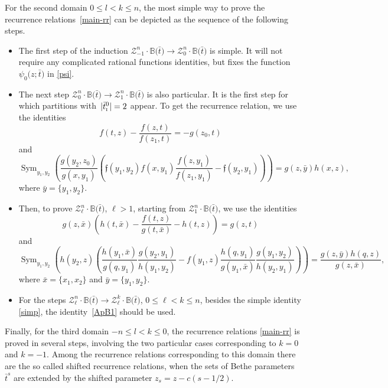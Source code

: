 \documentclass[10pt,a4paper]{amsart}
\newcommand{\so}{\scriptscriptstyle \rm I}
\newcommand{\bt}{{\bar t}}
\theoremstyle{definition}
\def\BB{{\mathbb{B}}}
\def\r#1{\eqref{#1}}
\def\sk#1{\left(#1\right)}
\def\fgo{\mathfrak{f}}
\def\Z{\mathcal{Z}}
\begin{document}
For the second domain $0\leq l< k\leq n$, the
 most simple way to prove the recurrence relations~\r{main-rr}
can be depicted as the sequence
of the following steps.

\begin{itemize}\itemsep=0pt
\item The first step of the induction $\Z^n_{-1}\cdot\BB\bigl(\bt\bigr)\to \Z^n_0\cdot\BB\bigl(\bt\bigr)$
is simple. It will not require any complicated rational functions identities,
but fixes the function $\psi_0\bigl(z;\bt\bigr)$ in \r{psi}.
 \item The next step $\Z^n_{0}\cdot\BB\bigl(\bt\bigr)\to \Z^n_1\cdot\BB\bigl(\bt\bigr)$ is also particular.
It is the first step for which partitions with~${|\bar t^0_{\so}|=2}$ appear.
 To get the recurrence relation, we use the identities
\begin{equation}\label{ApB0}
 f(t,z)-\frac{f(z,t)}{f(z_1,t)}=-g(z_0,t)
 \end{equation}
 and
\begin{equation}\label{ApB4}
 \mathop{\operatorname{ Sym}}_{y_1,y_2}\left(\frac{g(y_2,z_0)}{g(x,y_1)}
 \left(
 \fgo(y_1,y_2) f(x,y_1) \frac{f(z,y_1)}{f(z_1,y_1)} - \fgo(y_2,y_1)
 \right)\right)= g(z,\bar y) h(x,z) ,
 \end{equation}
 where $\bar y=\{y_1,y_2\}$.\item Then, to prove $\Z^n_\ell\cdot\BB\bigl(\bt\bigr)$, $\ell>1$, starting from $\Z^n_1\cdot\BB\bigl(\bt\bigr)$,
 we use the identities
\begin{equation}\label{ApB2}
g(z,\bar x)\sk{h(t,\bar x)-\frac{f(t,z)}
{g(t,\bar x)}-h(t,z)}=g(z,t)
\end{equation}
and
\begin{equation}\label{ApB3}
\mathop{\operatorname{ Sym}}_{y_1,y_2}\sk{h(y_2,z)
\sk{\frac{h(y_1,\bar x)}{g(q,y_1)} \frac{g(y_2,y_1)}{h(y_1,y_2)}
- f(y_1,z)
\frac{h(q,y_1)}{g(y_1,\bar x)} \frac{g(y_1,y_2)}{h(y_2,y_1)}}}=
\frac{g(z,\bar y)h(q,z)}{g(z,\bar x)} ,
\end{equation}
where $\bar x=\{x_1,x_2\}$ and $\bar y=\{y_1,y_2\}$.
\item For the steps $\Z^n_{\ell}\cdot\BB\bigl(\bt\bigr)\to \Z^k_\ell\cdot\BB\bigl(\bt\bigr)$, $0\leq \ell<k\leq n$,
besides the simple identity \r{simp}, the identity~\r{ApB1} should be used.
\end{itemize}

Finally, for the third domain $-n\leq l< k\leq 0$, the recurrence relations \r{main-rr}
 is proved in several steps, involving the two particular cases corresponding to
$k=0$ and $k=-1$.
Among the recurrence relations corresponding to this domain there are the
 so called shifted recurrence relations, when
the sets of Bethe parameters $\bt^s$ are extended by the shifted parameter
$z_s=z-c(s-1/2)$.
\end{document}
